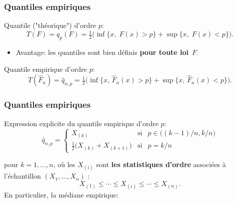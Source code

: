 
\begin{frame}
\frametitle{Quantiles empiriques}

Quantile ("th\'eorique") d'ordre $p$:
$$
T(F)=q_p(F) = \tfrac{1}{2}\big(\inf\{x,\;F(x)>p\}+\sup\{x,\;F(x) <
p\}\big).
$$
\begin{itemize}\item Avantage: les quantiles sont bien d\'efinis {\bf pour toute
loi}~$F$.
\end{itemize}

\vspace{3mm}

Quantile empirique d'ordre $p$:
$$T(\widehat F_n) = \widehat q_{n,p} =
\tfrac{1}{2}\big(\inf\{x,\,\widehat F_n(x)>p\}+\sup\{x,\,\widehat
F_n(x)<p\}\big).
$$
\end{frame}


\begin{frame}
\frametitle{Quantiles empiriques} Expression explicite du quantile
empirique d'ordre $p$:
$$\widehat q_{n,p} = \left\{
\begin{array}{lll}
X_{(k)} & \text{si} & p \in \big((k-1)/n, k/n\big) \\
\tfrac{1}{2}\big(X_{(k)}+X_{(k+1)}\big) & \text{si} & p=k/n
\end{array}
\right.$$

pour $k = 1,\ldots, n$, o\`u les $X_{(i)}$ sont {\bf les
statistiques d'ordre} associées à l'échantillon $(X_1,\ldots, X_n)$
:
$$
X_{(1)} \leq \cdots \leq X_{(i)} \leq \cdots \leq X_{(n)}.
$$
En particulier, la m\'ediane empirique:
\begin{center}
\end{center}
\end{frame}

